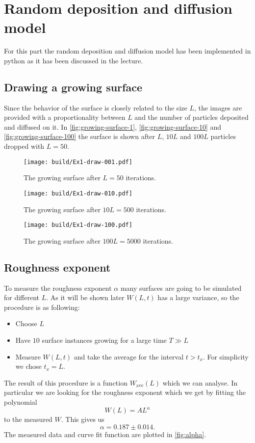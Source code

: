 \section{Random deposition and diffusion model}
\label{sec:exercise-1}
For this part the random deposition and diffusion model has been implemented in python as it has been discussed in the
lecture. 

\subsection{Drawing a growing surface}
\label{sec:RDD-drawing}
Since the behavior of the surface is closely related to the size $L$, the images are provided with a proportionality
between $L$ and the number of particles deposited and diffused on it. In 
\autoref{fig:growing-surface-1},
\autoref{fig:growing-surface-10} and
\autoref{fig:growing-surface-100}
the surface is shown after $L$, $10L$ and $100L$ particles dropped with $L=50$.
\begin{figure}
	\centering
  \texttt{[image: build/Ex1-draw-001.pdf]}
  \caption{The growing surface after $L = 50$ iterations.}
  \label{fig:growing-surface-1}
\end{figure}
\begin{figure}
	\centering
  \texttt{[image: build/Ex1-draw-010.pdf]}
  \caption{The growing surface after $10L = 500$ iterations.}
  \label{fig:growing-surface-10}
\end{figure}
\begin{figure}
	\centering
  \texttt{[image: build/Ex1-draw-100.pdf]}
  \caption{The growing surface after $100L = 5000$ iterations.}
  \label{fig:growing-surface-100}
\end{figure}

\subsection{Roughness exponent}
To measure the roughness exponent $\alpha$ many surfaces are going to be simulated for different $L$. As it will be
shown later $W(L,t)$ has a large variance, so the procedure is as following:
\begin{itemize}
  \item Choose $L$
  \item Have $10$ surface instances growing for a large time $T \gg L$
  \item Measure $W(L,t)$ and take the average for the interval $t > t_x$. For simplicity we chose $t_x = L$.
\end{itemize}
The result of this procedure is a function $W_\text{ave}(L)$ which we can analyse. In particular we are looking for the
roughness exponent which we get by fitting the polynomial 
\[
  W(L) = A L^\alpha
\]
to the measured $W$. This gives us
\[
  \alpha = 0.187 \pm 0.014.
\]
The measured data and curve fit function are plotted in \autoref{fig:alpha}.

